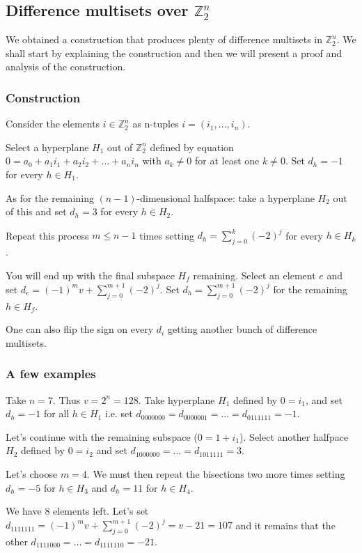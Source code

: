 \subsection{Difference multisets over $\mathbb Z_2^n$}
    We obtained a construction that produces plenty of difference multisets in $\mathbb Z_2^n$. We shall start by explaining the construction and then we will present a proof and analysis of the construction.

    \subsubsection{Construction}
        Consider the elements $i \in \mathbb Z_2^n$ as n-tuples $i=(i_1, \ldots, i_n)$.
        
        Select a hyperplane $H_1$ out of $\mathbb Z_2^n$ defined by equation $0 = a_0 + a_1 i_1 + a_2 i_2 + \ldots + a_n i_n$ with $a_k \neq 0$ for at least one $k \neq 0$. Set $d_h = -1$ for every $h \in H_1$.
        
        As for the remaining $(n-1)$-dimensional halfspace: take a hyperplane $H_2$ out of this and set $d_h = 3$ for every $h \in H_2$.
        
        Repeat this process $m \leq n-1$ times setting $d_h = \sum\limits_{j=0}^k (-2)^j$ for every $h \in H_k$.
        
        You will end up with the final subspace $H_f$ remaining. Select an element $e$ and set $d_e = (-1)^m v + \sum\limits_{j=0}^{m+1} (-2)^j$. Set $d_h = \sum\limits_{j=0}^{m+1} (-2)^j$ for the remaining $h \in H_f$.
        
        One can also flip the sign on every $d_i$ getting another bunch of difference multisets.
        
    \subsubsection{A few examples}
        
        \begin{example}
            Take $n=7$. Thus $v=2^n=128$. Take hyperplane $H_1$ defined by $0=i_1$, and set $d_h=-1$ for all $h\in H_1$ i.e. set $d_{0000000}=d_{0000001}=\ldots=d_{0111111}=-1$.
            
            Let's continue with the remaining subspace ($0=1+i_1$). Select another halfpace $H_2$ defined by $0=i_2$ and set $d_{1000000}=\ldots=d_{1011111}=3$.
            
            Let's choose $m=4$. We must then repeat the bisections two more times setting $d_h=-5$ for $h\in H_3$ and $d_h=11$ for $h \in H_4$.
            
            We have 8 elements left. Let's set $d_{1111111} = (-1)^{m} v + \sum\limits_{j=0}^{m+1} (-2)^j = v - 21 = 107$ and it remains that the other $d_{1111000}=\ldots=d_{1111110}=-21$.
        \end{example}
        
